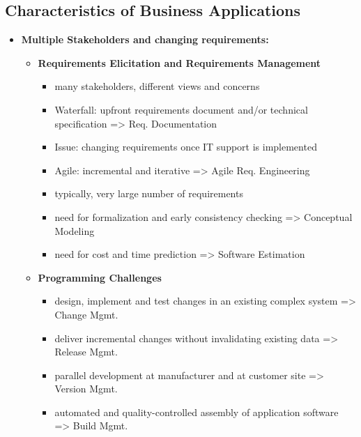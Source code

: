 \documentclass[ieeetran]{article}
\begin{document}
\subsection{Characteristics of Business Applications} %
\label{sub:characteristics_of_business_applications}
\begin{itemize}
  \item \textbf{Multiple Stakeholders and changing requirements:}
	  \begin{itemize}
	    \item \textbf{Requirements Elicitation and Requirements Management}
		    \begin{itemize}
		      \item many stakeholders, different views and concerns
		\item Waterfall: upfront requirements document and/or technical specification => Req. Documentation
		\item Issue: changing requirements once IT support is implemented
		\item Agile: incremental and iterative => Agile Req. Engineering
			\item typically, very large number of requirements
			\item need for formalization and early consistency checking => Conceptual Modeling
				\item need for cost and time prediction => Software Estimation

		    \end{itemize}

	\item \textbf{Programming Challenges}
		\begin{itemize}
		  \item design, implement and test changes in an existing complex system => Change Mgmt.
	\item deliver incremental changes without invalidating existing data => Release Mgmt.
		\item parallel development at manufacturer and at customer site => Version Mgmt.

		\item automated and quality-controlled assembly of application software => Build Mgmt.
		\end{itemize}
	  \end{itemize}


\end{itemize}
\end{document}
